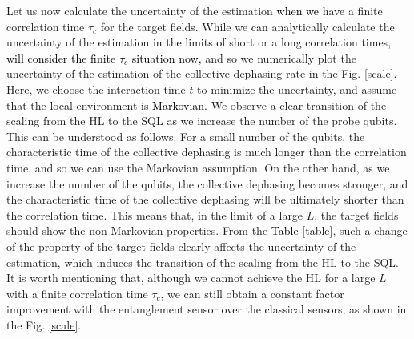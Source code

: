 \documentclass[prl,twocolumn,superscriptaddress]{revtex4}
\begin{document}
 
Let us now calculate the uncertainty of the estimation
\textcolor{black}{when we have} a finite
correlation time $\tau _c$ for the target fields. 
While we \textcolor{black}{can} analytically calculate the uncertainty of the estimation
\textcolor{black}{in the limits of}
short or a
long correlation times,
\textcolor{black}{will consider the finite $\tau _c$ situation now,}
and so we numerically plot the uncertainty of the estimation of the
collective dephasing rate in the Fig. \ref{scale}.
Here, we choose the interaction time $t$ to minimize the uncertainty,
and
assume that the local environment
\textcolor{black}{is Markovian.}
We observe a clear transition of the scaling from the
HL
to the SQL as we increase the number of the probe
qubits. This can be understood as follows. For a small number of the
qubits, the characteristic time of the collective dephasing is much
longer than the correlation time, and so we can use the Markovian
assumption.
On the other hand, as we increase the number of the qubits, the
collective dephasing becomes stronger, and the characteristic
time of the collective dephasing will be ultimately shorter than the
correlation time. This means that, in the limit of a large $L$,
the target fields should show the non-Markovian properties.
 From the \textcolor{black}{Table} \ref{table},
such a change of the property of the target fields clearly affects
the uncertainty of the estimation, which induces the transition of the
scaling from the HL
to the SQL.
It is worth mentioning that, although we
cannot achieve the
HL
for a large $L$ with a finite
correlation time $\tau _c$, we can still
obtain a constant factor improvement with the entanglement sensor over the classical sensors, as
shown in the Fig. \ref{scale}.
\end{document}
